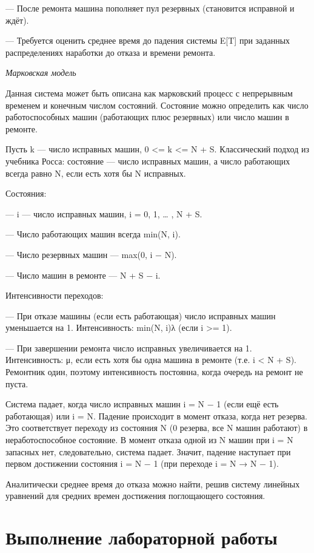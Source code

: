\documentclass[
  12pt,
  a4paper,
  DIV=11,
  numbers=noendperiod]{scrreprt}
\begin{document}
--- После ремонта машина пополняет пул резервных (становится исправной и
ждёт).

--- Требуется оценить среднее время до падения системы E{[}T{]} при
заданных распределениях наработки до отказа и времени ремонта.

\emph{Марковская модель}

Данная система может быть описана как марковский процесс с непрерывным
временем и конечным числом состояний. Состояние можно определить как
число работоспособных машин (работающих плюс резервных) или число машин
в ремонте.

Пусть k --- число исправных машин, 0 \textless= k \textless= N + S.
Классический подход из учебника Росса: состояние --- число исправных
машин, а число работающих всегда равно N, если есть хотя бы N исправных.

Состояния:

--- i --- число исправных машин, i = 0, 1, \ldots{} , N + S.

--- Число работающих машин всегда min(N, i).

--- Число резервных машин --- max(0, i − N).

--- Число машин в ремонте --- N + S − i.

Интенсивности переходов:

--- При отказе машины (если есть работающая) число исправных машин
уменьшается на 1. Интенсивность: min(N, i)λ (если i \textgreater= 1).

--- При завершении ремонта число исправных увеличивается на 1.
Интенсивность: μ, если есть хотя бы одна машина в ремонте (т.е. i
\textless{} N + S). Ремонтник один, поэтому интенсивность постоянна,
когда очередь на ремонт не пуста.

Система падает, когда число исправных машин i = N − 1 (если ещё есть
работающая) или i = N. Падение происходит в момент отказа, когда нет
резерва. Это соответствует переходу из состояния N (0 резерва, все N
машин работают) в неработоспособное состояние. В момент отказа одной из
N машин при i = N запасных нет, следовательно, система падает. Значит,
падение наступает при первом достижении состояния i = N − 1 (при
переходе i = N → N − 1).

Аналитически среднее время до отказа можно найти, решив систему линейных
уравнений для средних времен достижения поглощающего состояния.

\chapter{Выполнение лабораторной
работы}\label{ux432ux44bux43fux43eux43bux43dux435ux43dux438ux435-ux43bux430ux431ux43eux440ux430ux442ux43eux440ux43dux43eux439-ux440ux430ux431ux43eux442ux44b}
\end{document}
